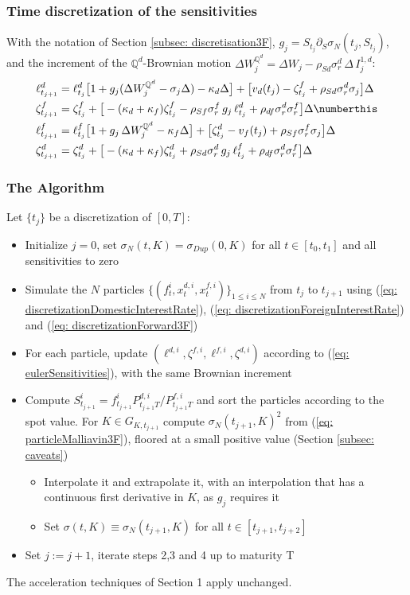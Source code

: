 \subsubsection*{Time discretization of the sensitivities}
With the notation of Section \ref{subsec: discretisation3F}, $g_j=S_{t_j}\partial_S\sigma_N(t_j,S_{t_j})$, and the increment of the $\mathbb{Q}^d$-Brownian motion $\Delta W^{\mathbb{Q}^d}_j=\Delta W_j-\rho_{Sd}\sigma^d_r\,\Delta\,I^{1,d}_j$:
\begin{align*}
\ell^d_{t_{j+1}}&=\ell^d_{t_j}\big[1+g_j(\Delta W^{\mathbb{Q}^d}_j-\sigma_j\Delta)-\kappa_d\Delta\big]
+\big[v_d(t_j)-\zeta^f_{t_j}+\rho_{Sd}\sigma^d_r\sigma_j\big]\Delta\\
\zeta^f_{t_{j+1}}&=\zeta^f_{t_j}+\big[-(\kappa_d+\kappa_f)\zeta^f_{t_j}-\rho_{Sf}\sigma^f_r\,g_j\,\ell^d_{t_j}+\rho_{df}\sigma^d_r\sigma^f_r\big]\Delta \numberthis\label{eq: eulerSensitivities}\\
\ell^f_{t_{j+1}}&=\ell^f_{t_j}\big[1+g_j\,\Delta W^{\mathbb{Q}^d}_j-\kappa_f\Delta\big]
+\big[\zeta^d_{t_j}-v_f(t_j)+\rho_{Sf}\sigma^f_r\sigma_j\big]\Delta\\
\zeta^d_{t_{j+1}}&=\zeta^d_{t_j}+\big[-(\kappa_d+\kappa_f)\zeta^d_{t_j}+\rho_{Sd}\sigma^d_r\,g_j\,\ell^f_{t_j}+\rho_{df}\sigma^d_r\sigma^f_r\big]\Delta
\end{align*}

\subsubsection*{The Algorithm}
Let $\{t_j\}$ be a discretization of $[0,T]$:
\begin{itemize}
\item[1.] Initialize $j=0$, set $\sigma_N(t,K)=\sigma_{Dup}(0,K)$ for all $t\in [t_0,t_1]$ and all sensitivities to zero
\item[2.] Simulate the $N$ particles  $\{(f_t^i, x_t^{d,i}, x^{f,i}_t) \}_{1\leq i\leq N}$ from  $t_{j}$ to  $t_{j+1}$ using  (\ref{eq: discretizationDomesticInterestRate}), (\ref{eq: discretizationForeignInterestRate}) and (\ref{eq: discretizationForward3F})
\item[3.] For each particle, update $(\ell^{d,i},\zeta^{f,i},\ell^{f,i},\zeta^{d,i})$ according to (\ref{eq: eulerSensitivities}), with the same Brownian increment
\item[4.] Compute $S^i_{t_{j+1}}=f^i_{t_{j+1}}P^{d,i}_{t_{j+1}T}/P^{f,i}_{t_{j+1}T}$ and sort the particles according to the spot value. For $K\in G_{K,t_{j+1}}$ compute $\sigma_N(t_{j+1},K)^2$ from (\ref{eq: particleMalliavin3F}), floored at a small positive value (Section \ref{subsec: caveats})
\begin{itemize}
\item Interpolate it and extrapolate it, with an interpolation that has a continuous first derivative in $K$, as $g_j$ requires it
\item Set $\sigma(t,K)\equiv \sigma_N(t_{j+1},K)$ for all $t\in [t_{j+1},t_{j+2}]$
\end{itemize}
\item[5.] Set $j:=j+1$, iterate steps 2,3 and 4 up to maturity T
\end{itemize}
The acceleration techniques of Section 1 apply unchanged.
